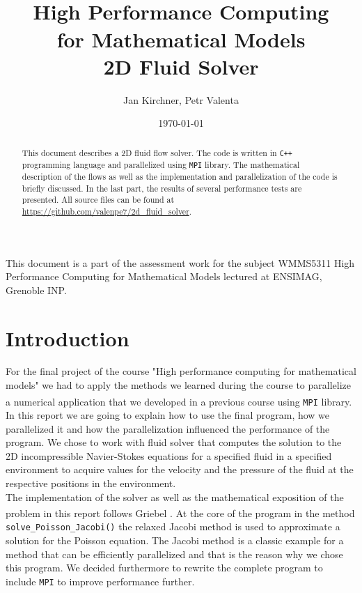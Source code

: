 \documentclass[a4paper, 10pt]{article}
\title{\horrule{0.5 pt}\\[0.4cm] \textbf{High Performance Computing \\ for Mathematical Models} \\ {\large 2D Fluid Solver} \horrule{1 pt}}
\author{Jan Kirchner, Petr Valenta}
\date{\today}
\begin{document}
\maketitle
{\small This document is a part of the assessment work for the subject WMMS5311 High Performance Computing for Mathematical Models lectured at ENSIMAG, Grenoble INP.}

\begin{abstract}
	This document describes a 2D fluid flow solver. The code is written in \texttt{C++} programming language and parallelized using \texttt{MPI} library. The mathematical description of the flows as well as the implementation and parallelization of the code is briefly discussed. In the last part, the results of several performance tests are presented. All source files can be found at \url{https://github.com/valenpe7/2d_fluid_solver}.  
\end{abstract}

\tableofcontents

\section{Introduction}
For the final project of the course "High performance computing for mathematical models" we had to apply the methods we learned during the course to parallelize a numerical application that we developed in a previous course using \texttt{MPI}\textsuperscript{\cite{gabriel04:_open_mpi}} library. In this report we are going to explain how to use the final program, how we parallelized it and how the parallelization influenced the performance of the program. We chose to work with fluid solver that computes the solution to the 2D incompressible Navier-Stokes equations for a specified fluid in a specified environment to acquire values for the velocity and the pressure of the fluid at the respective positions in the environment.\\

The implementation of the solver as well as the mathematical exposition of the problem in this report follows Griebel \textsuperscript{\cite{Griebel:1998:NSF:280492}}. At the core of the program in the method \texttt{solve\_Poisson\_Jacobi()} the relaxed Jacobi method is used to approximate a solution for the Poisson equation. The Jacobi method is a classic example for a method that can be efficiently parallelized and that is the reason why we chose this program. We decided furthermore to rewrite the complete program to include \texttt{MPI} to improve performance further.\\
\end{document}
